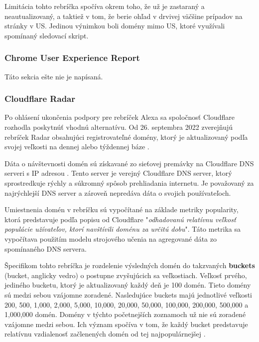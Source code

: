 Limitácia tohto rebríčka spočíva okrem toho, že už je zastaraný a neautualizovaný, a taktiež v tom, že berie ohľad v drvivej väčšine prípadov na stránky v US.
Jedinou výnimkou boli domény mimo US, ktoré využívali spomínaný sledovací skript. 

\subsubsection{Chrome User Experience Report}

Táto sekcia ešte nie je napísaná.

\subsubsection{Cloudflare Radar}

Po ohlásení ukončenia podpory pre rebríček Alexa sa spoločnosť Cloudflare rozhodla poskytnúť vhodnú alternatívu.
Od 26. septembra 2022 zverejňujú rebríček Radar obsahujúci registrovateľné domény, ktorý je aktualizovaný podľa svojej veľkosti na dennej alebo týždennej báze \cite{tranco-methodology}.

Dáta o návštevnosti domén sú získavané zo sieťovej premávky na Cloudflare DNS serveri s IP adresou .
Tento server je verejný Cloudflare DNS server, ktorý sprostredkuje rýchly a súkromný spôsob prehliadania internetu.
Je považovaný za najrýchlejší DNS server a zároveň nepredáva dáta o svojich používateľoch. %

Umiestnenia domén v rebríčku sú vypočítané na základe metriky popularity, ktorá predstavuje podľa popisu od Cloudflare "\textit{odhadovanú relatívnu veľkosť populácie užívateľov, ktorí navštívili doménu za určitú dobu}".
Táto metrika sa vypočítava použitím modelu strojového učenia na agregované dáta zo spomínaného DNS servera. 

Špecifikom tohto rebríčka je rozdelenie výsledných domén do takzvaných \textbf{buckets} (bucket, anglicky vedro) o postupne zvyšujúcich sa veľkostiach.
Veľkosť prvého, jediného bucketu, ktorý je aktualizovaný každý deň je 100 domén. Tieto domény sú medzi sebou vzájomne zoradené.
Nasledujúce buckets majú jednotlivé veľkosti 200, 500, 1,000, 2,000, 5,000, 10,000, 20,000, 50,000, 100,000, 200,000, 500,000 a 1,000,000 domén.
Domény v týchto početnejších zoznamoch už nie sú zoradené vzájomne medzi sebou.
Ich význam spočíva v tom, že každý bucket predstavuje relatívnu vzdialenosť začlenených domén od tej najpopulárnejšej \cite{cloudflare-radar}.



